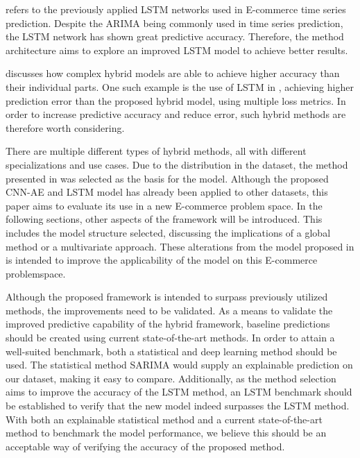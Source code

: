 refers to the previously applied LSTM networks used in E-commerce time series prediction.
Despite the ARIMA being commonly used in time series prediction, the LSTM network has shown great predictive accuracy.
Therefore, the method architecture aims to explore an improved LSTM model to achieve better results.

discusses how complex hybrid models are able to achieve higher accuracy than their individual parts.
One such example is the use of LSTM in \cite{Zhao2019}, achieving higher prediction error than the proposed hybrid model, using multiple loss metrics.
In order to increase predictive accuracy and reduce error, such hybrid methods are therefore worth considering.


There are multiple different types of hybrid methods, all with different specializations and use cases.
Due to the distribution in the dataset, the method presented in \cite{Zhao2019} was selected as the basis for the model.
Although the proposed CNN-AE and LSTM model has already been applied to other datasets, this paper aims to evaluate its use in a new E-commerce problem space.
In the following sections, other aspects of the framework will be introduced.
This includes the model structure selected, discussing the implications of a global method or a multivariate approach.
These alterations from the model proposed in \cite{Zhao2019} is intended to improve the applicability of the model on this E-commerce problemspace.


Although the proposed framework is intended to surpass previously utilized methods,
the improvements need to be validated.
As a means to validate the improved predictive capability of the hybrid framework,
baseline predictions should be created using current state-of-the-art methods.
In order to attain a well-suited benchmark, both a statistical and deep learning method should be used.
The statistical method SARIMA would supply an explainable prediction on our dataset, making it easy to compare.
Additionally, as the method selection aims to improve the accuracy of the LSTM method,
an LSTM benchmark should be established to verify that the new model indeed surpasses the LSTM method.
With both an explainable statistical method and a current state-of-the-art method to benchmark the model performance,
we believe this should be an acceptable way of verifying the accuracy of the proposed method.

